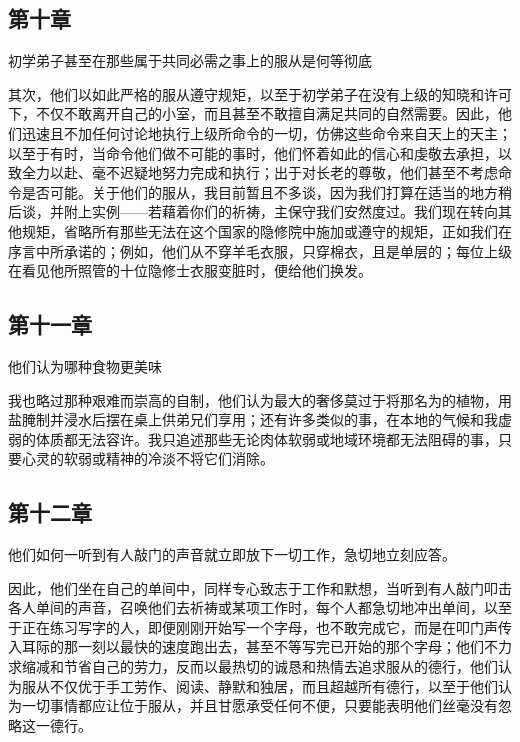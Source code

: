 
\subsection{第十章}

初学弟子甚至在那些属于共同必需之事上的服从是何等彻底\par

其次，他们以如此严格的服从遵守规矩，以至于初学弟子在没有上级的知晓和许可下，不仅不敢离开自己的小室，而且甚至不敢擅自满足共同的自然需要。因此，他们迅速且不加任何讨论地执行上级所命令的一切，仿佛这些命令来自天上的天主；以至于有时，当命令他们做不可能的事时，他们怀着如此的信心和虔敬去承担，以致全力以赴、毫不迟疑地努力完成和执行；出于对长老的尊敬，他们甚至不考虑命令是否可能。关于他们的服从，我目前暂且不多谈，因为我们打算在适当的地方稍后谈，并附上实例——若藉着你们的祈祷，主保守我们安然度过。我们现在转向其他规矩，省略所有那些无法在这个国家的隐修院中施加或遵守的规矩，正如我们在序言中所承诺的；例如，他们从不穿羊毛衣服，只穿棉衣，且是单层的；每位上级在看见他所照管的十位隐修士衣服变脏时，便给他们换发。\par


\subsection{第十一章}

他们认为哪种食物更美味\par

我也略过那种艰难而崇高的自制，他们认为最大的奢侈莫过于将那名为的植物，用盐腌制并浸水后摆在桌上供弟兄们享用；还有许多类似的事，在本地的气候和我虚弱的体质都无法容许。我只追述那些无论肉体软弱或地域环境都无法阻碍的事，只要心灵的软弱或精神的冷淡不将它们消除。\par


\subsection{第十二章}

他们如何一听到有人敲门的声音就立即放下一切工作，急切地立刻应答。\par

因此，他们坐在自己的单间中，同样专心致志于工作和默想，当听到有人敲门叩击各人单间的声音，召唤他们去祈祷或某项工作时，每个人都急切地冲出单间，以至于正在练习写字的人，即便刚刚开始写一个字母，也不敢完成它，而是在叩门声传入耳际的那一刻以最快的速度跑出去，甚至不等写完已开始的那个字母；他们不力求缩减和节省自己的劳力，反而以最热切的诚恳和热情去追求服从的德行，他们认为服从不仅优于手工劳作、阅读、静默和独居，而且超越所有德行，以至于他们认为一切事情都应让位于服从，并且甘愿承受任何不便，只要能表明他们丝毫没有忽略这一德行。\par

